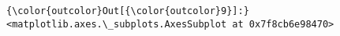 \documentclass[11pt]{article}
\begin{document}
\begin{Verbatim}[commandchars=\\\{\}]
{\color{outcolor}Out[{\color{outcolor}9}]:} <matplotlib.axes.\_subplots.AxesSubplot at 0x7f8cb6e98470>
\end{Verbatim}
            
    \begin{center}
    \end{center}
    { \hspace*{\fill} \\}
    

    
    
    
    
\end{document}
